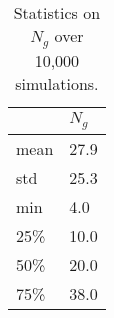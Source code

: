 \begin{table}[h]
    \label{fig:ngtable}
    \begin{center}
        \begin{tabular}{@{}ll@{}}
        \toprule
            & $N_g$          \\ \midrule
        mean  & 27.9          \\
        std   & 25.3 \\
        min   & 4.0                \\
        25\%   & 10.0               \\
        50\%   & 20.0               \\
        75\%   & 38.0               \\ \bottomrule
        \end{tabular}
        \caption{Statistics on $N_g$ over 10,000 simulations.}
    \end{center}
\end{table}